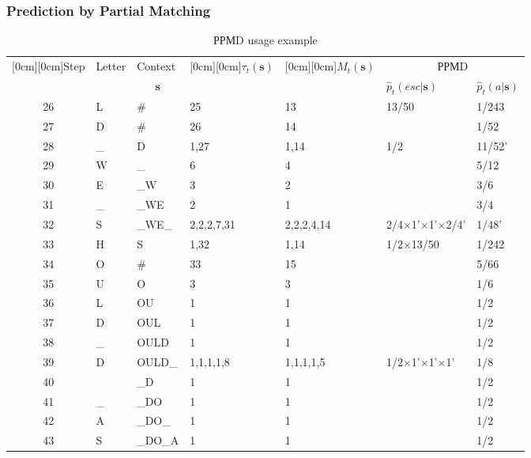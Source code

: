 \documentclass[14pt]{beamer}
\renewcommand{\vec}[1]{\ensuremath{\boldsymbol{#1}}}
\begin{document}
\begin{frame}
\frametitle{Prediction by Partial Matching}
\begin{itemize}    

    \begin{table}[htbp]
    \caption{РРМD usage example} \scriptsize{
    \begin{center}
    \scalebox{0.7} {
    \begin{tabular}
    {|c|l|l|l|l|l|l|} \hline %
    \raisebox{-1.50ex}[0cm][0cm]{Step}&
    {Letter}&
    {Context }&
    \raisebox{-1.50ex}[0cm][0cm]{$\tau _t ({\vec s})$}&
    \raisebox{-1.50ex}[0cm][0cm]{$M_t ({\vec s})$}&
    \multicolumn{2}{c|}{РРМD}  \\
    \cline{6-7}
     & & \multicolumn{1}{c|}{$\vec s$}&  &  & $\hat {p}_t(esc\vert {\vec s})$&
    $\hat {p}_t(a\vert {\vec s})$ \\ \hline %
    26& L& {\#}& 25& 13& 13/50& 1/243 \\ \hline %
    27& D& {\#}& 26& 14& & 1/52 \\ \hline %
    28& {\_}& D& 1,27& 1,14& 1/2& 11/52' \\ \hline %
    29& W& {\_}& 6& 4& & 5/12 \\ \hline %
    30& E& {\_}W& 3& 2& & 3/6 \\ \hline %
    31& {\_}& {\_}WE& 2& 1& & 3/4 \\ \hline %
    32& S& {\_}WE{\_}& 2,2,2,7,31& 2,2,2,4,14& 2/4$\times $1'$\times
    $1'$\times $2/4'& 1/48' \\ \hline %
    33& H& S& 1,32& 1,14& 1/2$\times $13/50& 1/242 \\ \hline %
    34& O& {\#}& 33& 15& & 5/66 \\ \hline %
    35& U& O& 3& 3& & 1/6 \\ \hline %
    36& L& OU& 1& 1& & 1/2 \\ \hline %
    37& D& OUL& 1& 1& & 1/2 \\ \hline %
    38& {\_}& OULD& 1& 1& & 1/2 \\ \hline %
    39& D& OULD{\_}& 1,1,1,1,8& 1,1,1,1,5& 1/2$\times $1'$\times
    $1'$\times $1'& 1/8 \\ \hline %
    40& & {\_}D& 1& 1& & 1/2 \\ \hline %
    41& {\_}& {\_}DO& 1& 1& & 1/2 \\ \hline %
    42& A& {\_}DO{\_}& 1& 1& & 1/2 \\ \hline %
    43& S& {\_}DO{\_}A& 1& 1& & 1/2 \\ \hline %

\end{tabular}}
\end{center}}
\end{table}
\end{itemize}
\end{frame}
\end{document}
